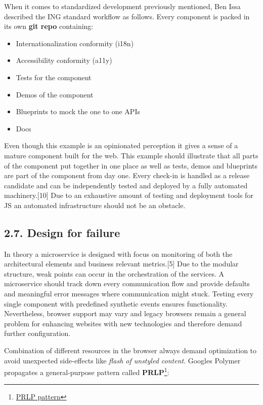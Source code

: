 \documentclass[]{article}
\providecommand{\tightlist}{%
  \setlength{\itemsep}{0pt}\setlength{\parskip}{0pt}}
\begin{document}
When it comes to standardized development previously mentioned, Ben Issa
described the ING standard workflow as follows. Every component is
packed in its own \textbf{git repo} containing:

\begin{itemize}
\tightlist
\item
  Internationalization conformity (i18n)
\item
  Accessibility conformity (a11y)
\item
  Tests for the component
\item
  Demos of the component
\item
  Blueprints to mock the one to one APIs
\item
  Docs
\end{itemize}

Even though this example is an opinionated perception it gives a sense
of a mature component built for the web. This example should illustrate
that all parts of the component put together in one place as well as
tests, demos and blueprints are part of the component from day one.
Every check-in is handled as a release candidate and can be
independently tested and deployed by a fully automated
machinery.{[}10{]} Due to an exhaustive amount of testing and deployment
tools for JS an automated infrastructure should not be an obstacle.

\subsection{2.7. Design for failure}\label{design-for-failure}

In theory a microservice is designed with focus on monitoring of both
the architectural elements and business relevant metrics.{[}5{]} Due to
the modular structure, weak points can occur in the orchestration of the
services. A microservice should track down every communication flow and
provide defaults and meaningful error messages where communication might
stuck. Testing every single component with predefined synthetic events
ensures functionality. Nevertheless, browser support may vary and legacy
browsers remain a general problem for enhancing websites with new
technologies and therefore demand further configuration.

Combination of different resources in the browser always demand
optimization to avoid unexpected side-effects like \emph{flash of
unstyled content}. Googles Polymer propagates a general-purpose pattern
called \textbf{PRLP}\footnote{\href{https://www.polymer-project.org/1.0/toolbox/server}{PRLP
  pattern}}:
\end{document}
